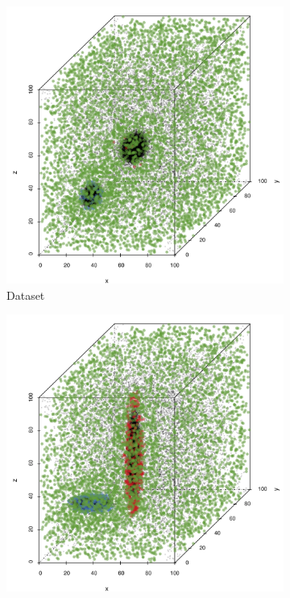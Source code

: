 			\begin{figure}
				\centering
				\begin{subfigure}{0.23\textwidth}
					\centering
					\includegraphics[keepaspectratio=true, width=\textwidth, height=0.23\textheight]{discussion/img/ferdosi_2_60000_anisotropy.png}
					\caption{Dataset \ferdosiTwo}
					\label{fig:discussion:anisotropy:ferdosi2}
				\end{subfigure}
				\begin{subfigure}{0.23\textwidth}
					\centering
					\includegraphics[keepaspectratio=true, width=\textwidth, height=0.23\textheight]{discussion/img/baakman_2_60000_anisotropy.png}

\end{subfigure}
\end{figure}
